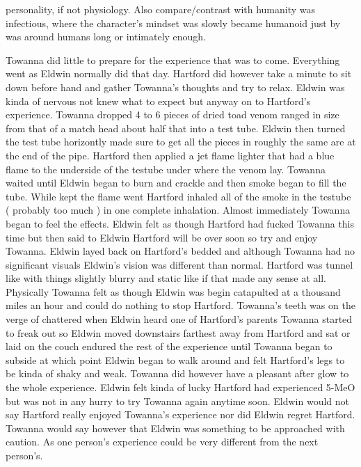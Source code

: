 \documentclass[12pt]{book}
\begin{document}
personality, if not physiology. Also compare/contrast with humanity was infectious, where the character's mindset was slowly became humanoid just by was around humans long or intimately enough.



Towanna did little to prepare for the experience that was to come. Everything went as Eldwin normally did that day. Hartford did however take a minute to sit down before hand and gather Towanna's thoughts and try to relax. Eldwin was kinda of nervous not knew what to expect but anyway on to Hartford's experience. Towanna dropped 4 to 6 pieces of dried toad venom ranged in size from that of a match head about half that into a test tube. Eldwin then turned the test tube horizontly made sure to get all the pieces in roughly the same are at the end of the pipe. Hartford then applied a jet flame lighter that had a blue flame to the underside of the testube under where the venom lay. Towanna waited until Eldwin began to burn and crackle and then smoke began to fill the tube. While kept the flame went Hartford inhaled all of the smoke in the testube ( probably too much ) in one complete inhalation. Almost immediately Towanna began to feel the effects. Eldwin felt as though Hartford had fucked Towanna this time but then said to Eldwin Hartford will be over soon so try and enjoy Towanna. Eldwin layed back on Hartford's bedded and although Towanna had no significant visuals Eldwin's vision was different than normal. Hartford was tunnel like with things slightly blurry and static like if that made any sense at all. Physically Towanna felt as though Eldwin was begin catapulted at a thousand miles an hour and could do nothing to stop Hartford. Towanna's teeth was on the verge of chattered when Eldwin heard one of Hartford's parents Towanna started to freak out so Eldwin moved downstairs farthest away from Hartford and sat or laid on the couch endured the rest of the experience until Towanna began to subside at which point Eldwin began to walk around and felt Hartford's legs to be kinda of shaky and weak. Towanna did however have a pleasant after glow to the whole experience. Eldwin felt kinda of lucky Hartford had experienced 5-MeO but was not in any hurry to try Towanna again anytime soon. Eldwin would not say Hartford really enjoyed Towanna's experience nor did Eldwin regret Hartford. Towanna would say however that Eldwin was something to be approached with caution. As one person's experience could be very different from the next person's.
\end{document}
